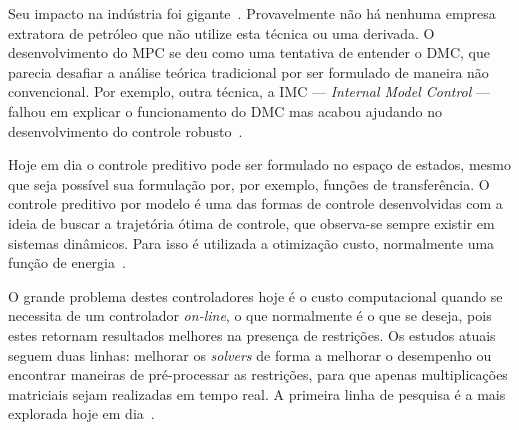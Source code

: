 Seu impacto na indústria foi gigante~\cite{article:morari}. Provavelmente não há
nenhuma empresa extratora de petróleo que não utilize esta técnica ou uma
derivada. O desenvolvimento do \ac{MPC} se deu como uma tentativa de entender o
\ac{DMC}, que parecia desafiar a análise teórica tradicional por ser formulado
de maneira não convencional. Por exemplo, outra técnica, a \ac{IMC} ---
\textit{Internal Model Control} --- falhou em explicar o funcionamento do \ac{DMC}
mas acabou ajudando no desenvolvimento do controle
robusto~\cite{article:morari}.

Hoje em dia o controle preditivo pode ser formulado no espaço de estados, mesmo
que seja possível sua formulação por, por exemplo, funções de transferência. O
controle preditivo por modelo é uma das formas de controle desenvolvidas com a
ideia de buscar a trajetória ótima de controle, que observa-se sempre existir em
sistemas dinâmicos. Para isso é utilizada a otimização custo, normalmente uma
função de energia~\cite{article:morari,book:bryson}.

O grande problema destes controladores hoje é o custo computacional quando se
necessita de um controlador \textit{on-line}, o que normalmente é o que se
deseja, pois estes retornam resultados melhores na presença de restrições. Os
estudos atuais seguem duas linhas: melhorar os \textit{solvers} de forma a
melhorar o desempenho ou encontrar maneiras de pré-processar as restrições, para
que apenas multiplicações matriciais sejam realizadas em tempo real. A primeira
linha de pesquisa é a mais explorada hoje em
dia~\cite{book:wang,masterthesis:zhang}.
